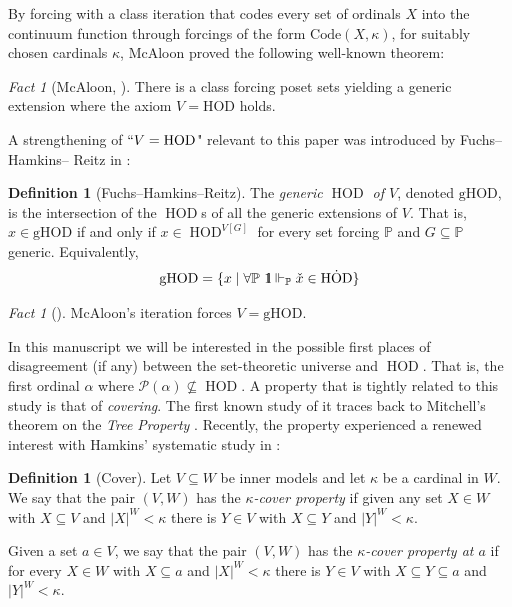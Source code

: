 \documentclass[11pt]{amsart}
\theoremstyle{definition}
\newtheorem{definition}[theorem]{Definition}
\theoremstyle{remark}
\newtheorem{fact}[theorem]{Fact}
\DeclareMathOperator{\HOD}{HOD}
\def\s{\subseteq}
\def\forces{\Vdash}
\newcommand{\one}{\mathop{1\hskip-3pt {\rm l}}}
\begin{document}
\smallskip

By forcing with a class iteration that codes every set of ordinals $X$ into the continuum function through forcings of the form $\mathrm{Code}(X,\kappa)$, for suitably chosen cardinals $\kappa$, McAloon proved the following well-known theorem:


\begin{fact}[McAloon, {\cite{McAloon}}]
  There is a class forcing poset sets yielding a generic extension where the axiom $V=\mathrm{HOD}$ holds.
\end{fact}

A strengthening of $``V=\HOD$" relevant to this paper was introduced by Fuchs--Hamkins-- Reitz in \cite{Geology}:

\begin{definition}[Fuchs--Hamkins--Reitz]
The \emph{generic $\HOD$ of $V$}, denoted $\mathrm{gHOD}$, is the intersection of the $\HOD$s of all the generic extensions of $V$. That is, $x\in \mathrm{gHOD}$ if and only if $x\in \HOD^{V[G]}$ for every set forcing $\mathbb{P}$ and $G\s \mathbb{P}$ generic. Equivalently, 
$$\mathrm{gHOD}=\{x\mid \forall \mathbb{P}\, \one\forces_{\mathbb{P}}\check{x}\in\dot{\HOD}\}$$
\end{definition}

\begin{fact}[{\cite[Theorem 66]{Geology}}]
    McAloon's iteration  forces $V=\mathrm{gHOD}$.
\end{fact}

\medskip

In this manuscript we will be interested in  the possible first places of disagreement (if any) between the set-theoretic universe and $\HOD$. That is, the first ordinal $\alpha$  where $\mathcal{P}(\alpha)\nsubseteq \HOD$. A property that is tightly related to this study is that of \emph{covering}. The first known study of it traces back to Mitchell's theorem on the \emph{Tree Property}  \cite{MitchellAronszajn}. Recently, the property experienced a renewed interest with Hamkins' systematic study in \cite{HamCover}:

 
\begin{definition}[Cover]
  Let $V\s W$ be inner models and let $\kappa$ be a cardinal in $W$. We say that the pair $(V,W)$ has the \emph{$\kappa$-cover property} if given any set $X\in W$ with $X\s V$ and $|X|^W<\kappa$ there is $Y\in V$ with $X\s Y$ and $|Y|^W<\kappa$.

  Given a set $a\in V$, we say that the pair $(V,W)$ has the \emph{$\kappa$-cover property at $a$} if for every $X\in W$ with $X\s a$ and $|X|^W<\kappa$ there is $Y\in V$ with $X\s Y\s a$ and $|Y|^W<\kappa$. 
\end{definition}
\end{document}
